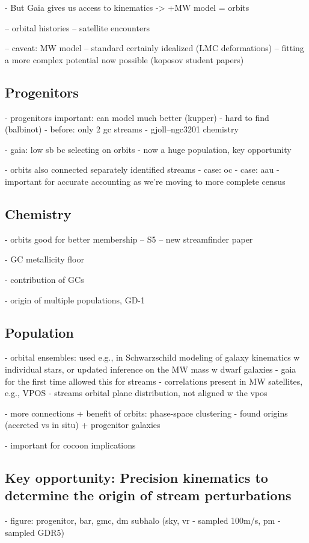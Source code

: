 \documentclass[final,5p,times,twocolumn,authoryear]{elsarticle}
\begin{document}
- But Gaia gives us access to kinematics -> +MW model = orbits

-- orbital histories
-- satellite encounters

-- caveat: MW model
-- standard certainly idealized (LMC deformations)
-- fitting a more complex potential now possible (koposov student papers)


\subsection{Progenitors}
- progenitors important: can model much better (kupper)
- hard to find (balbinot)
- before: only 2 gc streams
- gjoll--ngc3201 chemistry \citep{hansen:2020}

- gaia: low sb bc selecting on orbits
- now a huge population, key opportunity

- orbits also connected separately identified streams
- case: oc
- case: aau \citep{li:2021}
- important for accurate accounting as we're moving to more complete census


\subsection{Chemistry}
- orbits good for better membership
-- S5 \citep{li:2022}
-- new streamfinder paper

- GC metallicity floor

- contribution of GCs

- origin of multiple populations, GD-1


\subsection{Population}
- orbital ensembles: used e.g., in Schwarzschild modeling of galaxy kinematics w individual stars, or updated inference on the MW mass w dwarf galaxies
- gaia for the first time allowed this for streams
- correlations present in MW satellites, e.g., VPOS
- streams orbital plane distribution, not aligned w the vpos \citep{riley:2020}

- more connections + benefit of orbits: phase-space clustering \citep{bonaca:2021}
- found origins (accreted vs in situ) + progenitor galaxies

- important for cocoon implications


\subsection{Key opportunity: Precision kinematics to determine the origin of stream perturbations}
- figure: progenitor, bar, gmc, dm subhalo (sky, vr - sampled 100m/s, pm - sampled GDR5)
\end{document}
